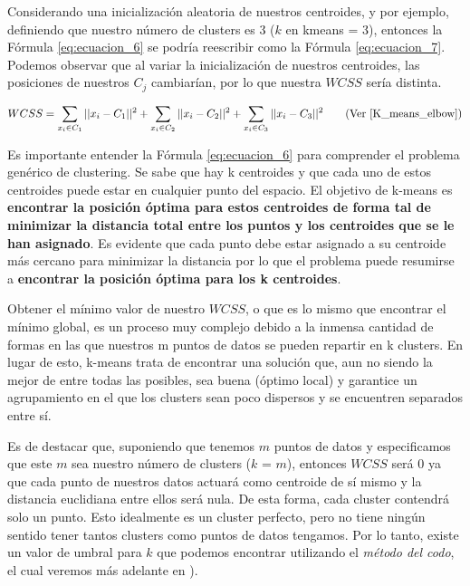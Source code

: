 \documentclass[12pt,a4paper]{article}
\begin{document}
\begin{sloppypar}
Considerando una inicialización aleatoria de nuestros centroides, y por ejemplo, definiendo que nuestro número de clusters es 3 ($k$ en kmeans = 3), entonces la Fórmula \ref{eq:ecuacion_6} se podría reescribir como la Fórmula \ref{eq:ecuacion_7}. Podemos observar que al variar la inicialización de nuestros centroides, las posiciones de nuestros $C_{j}$ cambiarían, por lo que nuestra $WCSS$ sería distinta. 

\begin{equation}\label{eq:ecuacion_7}
WCSS =  \sum_{x_{i} \in C_{1}}||x_{i}-C_{1}||^2 + \sum_{x_{i} \in C_{2}}||x_{i}-C_{2}||^2 + \sum_{x_{i} \in C_{3}}||x_{i}-C_{3}||^2     \qquad  \text{(Ver \cite{K_means_elbow})}
\end{equation}

\cleardoublepage
Es importante entender la Fórmula \ref{eq:ecuacion_6} para comprender el problema genérico de clustering. Se sabe que hay k centroides y que cada uno de estos centroides puede estar en cualquier punto del espacio. El objetivo de k-means es \textbf{encontrar la posición óptima para estos centroides de forma tal de minimizar la distancia total entre los puntos y los centroides que se le han asignado}. Es evidente que cada punto debe estar asignado a su centroide más cercano para minimizar la distancia por lo que el problema puede resumirse a \textbf{encontrar la posición óptima para los k centroides}.

Obtener el mínimo valor de nuestro $WCSS$, o que es lo mismo que encontrar el mínimo global, es un proceso muy complejo debido a la inmensa cantidad de formas en las que nuestros m puntos de datos se pueden repartir en k clusters. En lugar de esto, k-means trata de encontrar una solución que, aun no siendo la mejor de entre todas las posibles, sea buena (óptimo local) y garantice un agrupamiento en el que los clusters sean poco dispersos y se encuentren separados entre sí.

Es de destacar que, suponiendo que tenemos $m$ puntos de datos y especificamos que este $m$ sea nuestro número de clusters ($k$ = $m$), entonces $WCSS$ será 0 ya que cada punto de nuestros datos actuará como centroide de sí mismo y la distancia euclidiana entre ellos será nula. De esta forma, cada cluster contendrá solo un punto. Esto idealmente es un cluster perfecto, pero no tiene ningún sentido tener tantos clusters como puntos de datos tengamos. Por lo tanto, existe un valor de umbral para $k$ que podemos encontrar utilizando el \textit{método del codo}, el cual veremos más adelante en \textit{}).


\end{sloppypar}
\end{document}

